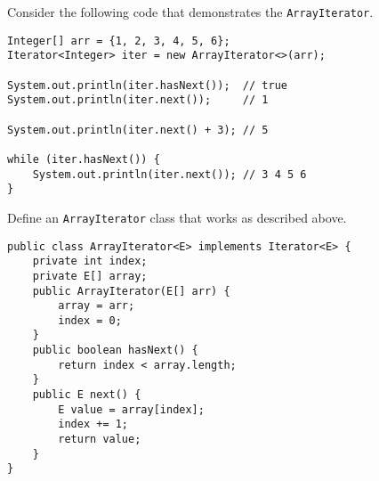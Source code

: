 \question Consider the following code that demonstrates the
\lstinline$ArrayIterator$.

\begin{lstlisting}
Integer[] arr = {1, 2, 3, 4, 5, 6};
Iterator<Integer> iter = new ArrayIterator<>(arr);

System.out.println(iter.hasNext());  // true
System.out.println(iter.next());     // 1

System.out.println(iter.next() + 3); // 5

while (iter.hasNext()) {
    System.out.println(iter.next()); // 3 4 5 6
}
\end{lstlisting}

Define an \lstinline$ArrayIterator$ class that works as described above.

\begin{solution}[3in]
\begin{lstlisting}
public class ArrayIterator<E> implements Iterator<E> {
    private int index;
    private E[] array;
    public ArrayIterator(E[] arr) {
        array = arr;
        index = 0;
    }
    public boolean hasNext() {
        return index < array.length;
    }
    public E next() {
        E value = array[index];
        index += 1;
        return value;
    }
}
\end{lstlisting}
\end{solution}
